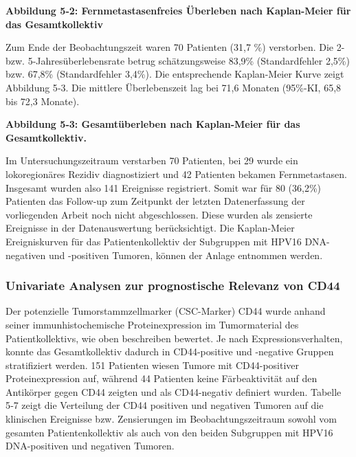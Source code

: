 \begin{quote}
\end{quote}

\textbf{Abbildung 5‑2: Fernmetastasenfreies Überleben nach Kaplan-Meier für das Gesamtkollektiv}

Zum Ende der Beobachtungszeit waren 70 Patienten (31,7 \%) verstorben. Die 2- bzw. 5-Jahresüberlebensrate betrug schätzungsweise 83,9\% (Standardfehler 2,5\%) bzw. 67,8\% (Standardfehler 3,4\%). Die entsprechende Kaplan-Meier Kurve zeigt Abbildung 5‑3. Die mittlere Überlebenszeit lag bei 71,6 Monaten (95\%-KI, 65,8 bis 72,3 Monate).

\begin{quote}
\end{quote}

\textbf{Abbildung 5‑3: Gesamtüberleben nach Kaplan-Meier für das Gesamtkollektiv.}

Im Untersuchungszeitraum verstarben 70 Patienten, bei 29 wurde ein lokoregionäres Rezidiv diagnostiziert und 42 Patienten bekamen Fernmetastasen. Insgesamt wurden also 141 Ereignisse registriert. Somit war für 80 (36,2\%) Patienten das Follow-up zum Zeitpunkt der letzten Datenerfassung der vorliegenden Arbeit noch nicht abgeschlossen. Diese wurden als zensierte Ereignisse in der Datenauswertung berücksichtigt. Die Kaplan-Meier Ereigniskurven für das Patientenkollektiv der Subgruppen mit HPV16 DNA-negativen und -positiven Tumoren, können der Anlage entnommen werden.

\hypertarget{univariate-analysen-zur-prognostische-relevanz-von-cd44}{%
\subsubsection{Univariate Analysen zur prognostische Relevanz von CD44}\label{univariate-analysen-zur-prognostische-relevanz-von-cd44}}

Der potenzielle Tumorstammzellmarker (CSC-Marker) CD44 wurde anhand seiner immunhistochemische Proteinexpression im Tumormaterial des Patientkollektivs, wie oben beschreiben bewertet. Je nach Expressionsverhalten, konnte das Gesamtkollektiv dadurch in CD44-positive und -negative Gruppen stratifiziert werden. 151 Patienten wiesen Tumore mit CD44-positiver Proteinexpression auf, während 44 Patienten keine Färbeaktivität auf den Antikörper gegen CD44 zeigten und als CD44-negativ definiert wurden. Tabelle 5‑7 zeigt die Verteilung der CD44 positiven und negativen Tumoren auf die klinischen Ereignisse bzw. Zensierungen im Beobachtungszeitraum sowohl vom gesamten Patientenkollektiv als auch von den beiden Subgruppen mit HPV16 DNA-positiven und negativen Tumoren.

